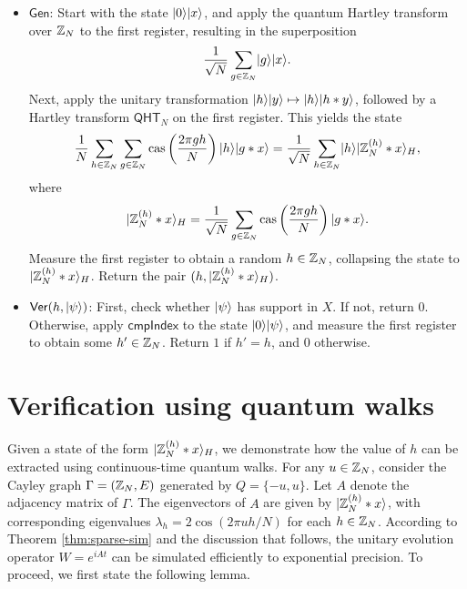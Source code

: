 \documentclass[11pt]{article}
\theoremstyle{definition}
\newcommand{\cas}{\mathrm{cas}}
\newcommand{\qht}{\mathsf{QHT}}
\newcommand{\comph}{\mathsf{cmpIndex}}
\newcommand{\gen}{\mathsf{Gen}}
\newcommand{\ver}{\mathsf{Ver}}
\begin{document}
\begin{itemize}
    \item \textbf{\( \gen \)}: Start with the state \( \lvert0\rangle\lvert x\rangle \), and apply the quantum Hartley transform over \( \mathbb{Z}_N \) to the first register, resulting in the superposition
    \[
    \frac{1}{\sqrt{N}} \sum_{g \in \mathbb{Z}_N} \lvert g\rangle\lvert x\rangle.
    \]
    Next, apply the unitary transformation \( \lvert h\rangle\lvert y\rangle \mapsto \lvert h\rangle\lvert h * y\rangle \), followed by a Hartley transform \( \qht_N \) on the first register. This yields the state
    \[
    \frac{1}{N} \sum_{h \in \Z_N} \sum_{g \in \Z_N} \cas\left(\frac{2\pi gh}{N}\right) \ket{h}\ket{g * x}
    = \frac{1}{\sqrt{N}} \sum_{h \in \Z_N} \ket{h} \ket{\Z_N^{(h)} * x}_H,
    \]
    where
    \[
    \ket{\Z_N^{(h)} * x}_H = \frac{1}{\sqrt{N}} \sum_{g \in \Z_N} \cas\left(\frac{2\pi gh}{N}\right) \ket{g * x}.
    \]
    Measure the first register to obtain a random \( h \in \mathbb{Z}_N \), collapsing the state to \( \lvert\mathbb{Z}_N^{(h)} * x\rangle_H \). Return the pair \( (h, \lvert\mathbb{Z}_N^{(h)} * x\rangle_H) \).

    \item \textbf{\( \ver(h, \ket{\psi}) \)}: First, check whether \( \lvert\psi\rangle \) has support in \( X \). If not, return \( 0 \). Otherwise, apply \( \comph \) to the state \( \lvert0\rangle \lvert\psi\rangle \), and measure the first register to obtain some \( h' \in \mathbb{Z}_N \). Return \( 1 \) if \( h' = h \), and \( 0 \) otherwise.
\end{itemize}


\section*{Verification using quantum walks}


Given a state of the form $\lvert\mathbb{Z}_N^{(h)} * x\rangle_H$, we demonstrate how the value of $h$ can be extracted using continuous-time quantum walks. For any $u \in \mathbb{Z}_N$, consider the Cayley graph $\Gamma = (\mathbb{Z}_N, E)$ generated by $Q = {\{-u, u}\}$. Let $A$ denote the adjacency matrix of $\Gamma$. The eigenvectors of $A$ are given by $\lvert\mathbb{Z}_N^{(h)} * x\rangle$, with corresponding eigenvalues $\lambda_h = 2\cos(2\pi uh / N)$ for each $h \in \mathbb{Z}_N$. According to Theorem \ref{thm:sparse-sim} and the discussion that follows, the unitary evolution operator $W = e^{iAt}$ can be simulated efficiently to exponential precision. To proceed, we first state the following lemma.
\end{document}
